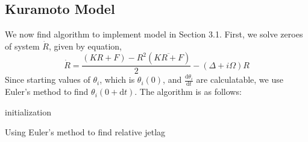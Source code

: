 \subsection{Kuramoto Model}
We now find algorithm to implement model in Section 3.1. First, we solve zeroes of system $\dot{R}$, given by equation,
$$\dot{R} = \frac{(KR + F) - R^2(\overline{KR + F})}{2} - (\Delta + i\Omega)R$$
Since starting values of $\theta_i$, which is $\theta_i(0)$, and $\frac{\mathrm{d} \theta_i}{\mathrm{d} t}$ are calculatable, we use Euler's method to find $\theta_i(0 + \mathrm{d}t)$. 
The algorithm is as follows:
\begin{center}
\begin{algorithm}[h]
\SetAlgoLined
{}

 \;
 initialization\;
 \;
 \caption{Using Euler's method to find relative jetlag}
\end{algorithm}
\end{center}
